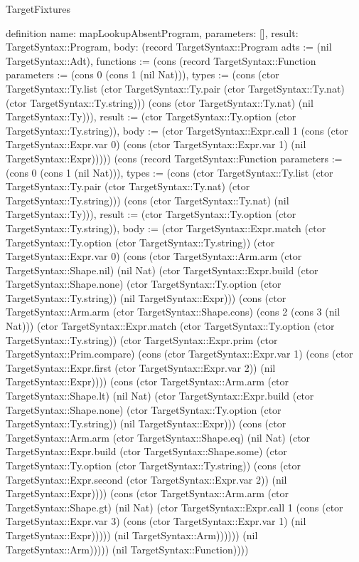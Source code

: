 \begin{lexlean}{TargetFixtures}
\begin{semanticmodule}
definition{
  name: mapLookupAbsentProgram,
  parameters: [],
  result: TargetSyntax::Program,
  body: (record TargetSyntax::Program {adts := (nil TargetSyntax::Adt), functions := (cons (record TargetSyntax::Function {parameters := (cons 0 (cons 1 (nil Nat))), types := (cons (ctor TargetSyntax::Ty.list (ctor TargetSyntax::Ty.pair (ctor TargetSyntax::Ty.nat) (ctor TargetSyntax::Ty.string))) (cons (ctor TargetSyntax::Ty.nat) (nil TargetSyntax::Ty))), result := (ctor TargetSyntax::Ty.option (ctor TargetSyntax::Ty.string)), body := (ctor TargetSyntax::Expr.call 1 (cons (ctor TargetSyntax::Expr.var 0) (cons (ctor TargetSyntax::Expr.var 1) (nil TargetSyntax::Expr))))}) (cons (record TargetSyntax::Function {parameters := (cons 0 (cons 1 (nil Nat))), types := (cons (ctor TargetSyntax::Ty.list (ctor TargetSyntax::Ty.pair (ctor TargetSyntax::Ty.nat) (ctor TargetSyntax::Ty.string))) (cons (ctor TargetSyntax::Ty.nat) (nil TargetSyntax::Ty))), result := (ctor TargetSyntax::Ty.option (ctor TargetSyntax::Ty.string)), body := (ctor TargetSyntax::Expr.match (ctor TargetSyntax::Ty.option (ctor TargetSyntax::Ty.string)) (ctor TargetSyntax::Expr.var 0) (cons (ctor TargetSyntax::Arm.arm (ctor TargetSyntax::Shape.nil) (nil Nat) (ctor TargetSyntax::Expr.build (ctor TargetSyntax::Shape.none) (ctor TargetSyntax::Ty.option (ctor TargetSyntax::Ty.string)) (nil TargetSyntax::Expr))) (cons (ctor TargetSyntax::Arm.arm (ctor TargetSyntax::Shape.cons) (cons 2 (cons 3 (nil Nat))) (ctor TargetSyntax::Expr.match (ctor TargetSyntax::Ty.option (ctor TargetSyntax::Ty.string)) (ctor TargetSyntax::Expr.prim (ctor TargetSyntax::Prim.compare) (cons (ctor TargetSyntax::Expr.var 1) (cons (ctor TargetSyntax::Expr.first (ctor TargetSyntax::Expr.var 2)) (nil TargetSyntax::Expr)))) (cons (ctor TargetSyntax::Arm.arm (ctor TargetSyntax::Shape.lt) (nil Nat) (ctor TargetSyntax::Expr.build (ctor TargetSyntax::Shape.none) (ctor TargetSyntax::Ty.option (ctor TargetSyntax::Ty.string)) (nil TargetSyntax::Expr))) (cons (ctor TargetSyntax::Arm.arm (ctor TargetSyntax::Shape.eq) (nil Nat) (ctor TargetSyntax::Expr.build (ctor TargetSyntax::Shape.some) (ctor TargetSyntax::Ty.option (ctor TargetSyntax::Ty.string)) (cons (ctor TargetSyntax::Expr.second (ctor TargetSyntax::Expr.var 2)) (nil TargetSyntax::Expr)))) (cons (ctor TargetSyntax::Arm.arm (ctor TargetSyntax::Shape.gt) (nil Nat) (ctor TargetSyntax::Expr.call 1 (cons (ctor TargetSyntax::Expr.var 3) (cons (ctor TargetSyntax::Expr.var 1) (nil TargetSyntax::Expr))))) (nil TargetSyntax::Arm)))))) (nil TargetSyntax::Arm))))}) (nil TargetSyntax::Function)))})
}


\end{semanticmodule}
\end{lexlean}
